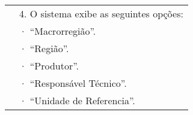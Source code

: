 \begin{table}[!h]
\begin{tabular}{|l|l|}
                                                         & 4. O sistema exibe as seguintes opções:                                                                                                                                                                                                                                                                                                                                                  \\ \cline{2-2} 
                                                         & ·         “Macrorregião”.                                                                                                                                                                                                                                                                                                                                                                \\ \cline{2-2} 
                                                         & ·         “Região”.                                                                                                                                                                                                                                                                                                                                                                      \\ \cline{2-2} 
                                                         & ·         “Produtor”.                                                                                                                                                                                                                                                                                                                                                                    \\ \cline{2-2} 
                                                         & ·         “Responsável Técnico”.                                                                                                                                                                                                                                                                                                                                                         \\ \cline{2-2} 
                                                         & ·         “Unidade de Referencia”.                                                                                                                                                                                                                                                                                                                                                       \\ \cline{2-2} 

\end{tabular}
\end{table}
